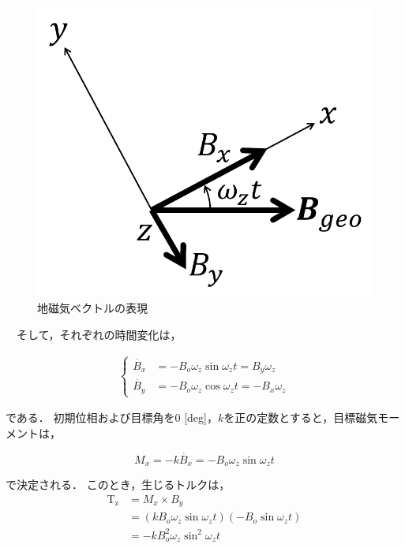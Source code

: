 \begin{figure}[H]
	\centering
		\includegraphics[scale=0.5]{./figure/B-dot1-crop.pdf}
		\caption{地磁気ベクトルの表現}
		\label{fig:geo}
\end{figure}

　そして，それぞれの時間変化は，

\begin{align}
    \left\{
        \begin{aligned}
            \dot{B_x} &= -B_o\omega_z\sin\omega_zt = B_y\omega_z\\
            \dot{B_y} &= -B_o\omega_z\cos\omega_zt = -B_x\omega_z
        \end{aligned}                    
    \right.
\end{align}

である．
初期位相および目標角を0 [deg]，$k$を正の定数とすると，目標磁気モーメントは，

\begin{equation}
    M_x = -k\dot{B_x} = -B_o\omega_z\sin\omega_zt
\end{equation}

で決定される．
このとき，生じるトルクは，
\begin{equation}
    \begin{aligned}
        \mathrm{T_z} &= M_x \times B_y\\
                     &= (kB_o\omega_z\sin\omega_zt)(-B_o\sin\omega_zt)\\
                     &= -kB_o^2\omega_z\sin^2\omega_zt
    \end{aligned}
\end{equation}

